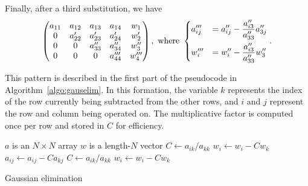 \documentclass{article}
\begin{document}
        Finally, after a third substitution, we have
        \begin{equation*}
            \begin{pmatrix}
                a_{11} & a_{12}  & a_{13}   & a_{14}    & w_1   \\
                0      & a'_{22} & a'_{23}  & a'_{24}   & w'_2  \\
                0      & 0       & a''_{33} & a''_{34}  & w''_3 \\
                0      & 0       & 0        & a'''_{44} & w'''_4 \\
            \end{pmatrix}, \text{ where }
            \begin{dcases}
                a'''_{ij} &= a''_{ij} - \frac{a''_{i3}}{a''_{33}} a''_{3j} \\
                w'''_i    &= w''_i - \frac{a''_{i3}}{a''_{33}} w''_3
            \end{dcases}.
        \end{equation*}

        This pattern is described in the first part of the pseudocode in Algorithm~\ref{algo:gauselim}. In this formation, the variable $k$ represents the index of the row currently being subtracted from the other rows, and $i$ and $j$ represent the row and column being operated on. The multiplicative factor is computed once per row and stored in $C$ for efficiency.

        \begin{algorithm}
            \begin{algorithmic}
                \Require $a$ is an $N \times N$ array
                \Require $w$ is a length-$N$ vector
                 
                        \State $C \gets a_{ik} / a_{kk}$
                        \State $w_i \gets w_i - C w_k$
                            \State $a_{ij} \gets a_{ij} - C a_{kj}$
                        \EndFor
                    \EndFor
                \EndFor
                 
                        \State $C \gets a_{ik} / a_{kk}$
                        \State $w_i \gets w_i - C w_k$
                    \EndFor
                \EndFor
            \end{algorithmic}
            \caption{Gaussian elimination}
            \label{algo:gauselim}
        \end{algorithm}
\end{document}
